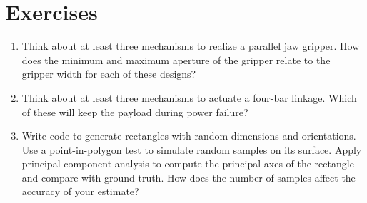 \section{Exercises}
\begin{enumerate}
\item Think about at least three mechanisms to realize a parallel jaw gripper. How does the minimum and maximum aperture of the gripper relate to the gripper width for each of these designs?
\item Think about at least three mechanisms to actuate a four-bar linkage. Which of these will keep the payload during power failure?
\item Write code to generate rectangles with random dimensions and orientations. Use a point-in-polygon test to simulate random samples on its surface. Apply principal component analysis to compute the principal axes of the rectangle and compare with ground truth. How does the number of samples affect the accuracy of your estimate?
\end{enumerate}
